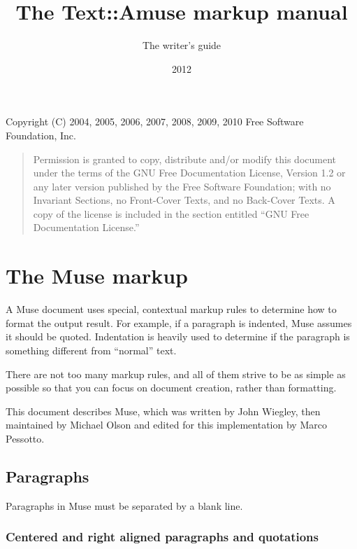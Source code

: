 \documentclass[DIV=12,%
               BCOR=0mm,%
               fontsize=10pt,%
               oneside,%
               paper=210mm:11in]{scrbook}
\title{The Text::Amuse markup manual}
\date{2012}
\author{}
\subtitle{The writer's guide}
\newcommand*{\Slash}{\slash\hspace{0pt}}
\begin{document}
\maketitle




\tableofcontents
\cleardoublepage




Copyright (C) 2004, 2005, 2006, 2007, 2008, 2009, 2010 Free Software
Foundation, Inc.



\begin{quote}


Permission is granted to copy, distribute and\Slash{}or modify this
document under the terms of the GNU Free Documentation License,
Version 1.2 or any later version published by the Free Software
Foundation; with no Invariant Sections, no Front-Cover Texts, and
no Back-Cover Texts.  A copy of the license is included in the
section entitled “GNU Free Documentation License.”



\end{quote}

\part{The Muse markup}


A Muse document uses special, contextual markup rules to determine how
to format the output result.  For example, if a paragraph is indented,
Muse assumes it should be quoted. Indentation is heavily used to
determine if the paragraph is something different from “normal” text.


There are not too many markup rules, and all of them strive to be as
simple as possible so that you can focus on document creation, rather
than formatting.


This document describes Muse, which was written by John
Wiegley, then maintained by Michael Olson and edited for this
implementation by Marco Pessotto.

\chapter{Paragraphs}


Paragraphs in Muse must be separated by a blank line.

\section{Centered and right aligned paragraphs and quotations}
\end{document}
